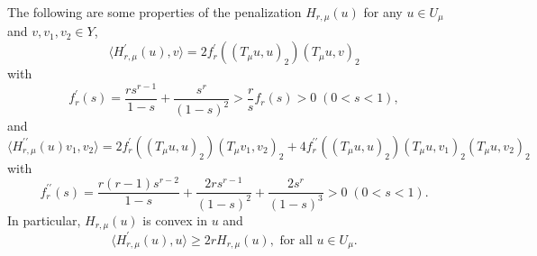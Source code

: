 \documentclass[11pt]{amsart}
\numberwithin{equation}{section}
\begin{document}
The following are some properties of the penalization $H_{r, \mu}(u)$ for any $u \in U_{\mu}$ and $v, v_{1}, v_{2} \in Y$,
$$
\langle H_{r, \mu}^{\prime}(u), v\rangle=2 f_{r}^{\prime}((T_{\mu} u, u)_{2})(T_{\mu} u, v)_{2}
$$
with
$$
f_{r}^{\prime}(s)=\frac{r s^{r-1}}{1-s}+\frac{s^{r}}{(1-s)^{2}}>\frac{r}{s} f_{r}(s)>0 \;(0<s<1),
$$
and
\begin{equation*}
\langle H_{r, \mu}^{\prime \prime}(u) v_{1}, v_{2}\rangle=2 f_{r}^{\prime}((T_{\mu} u, u)_{2})(T_{\mu} v_{1}, v_{2})_{2}+4 f_{r}^{\prime \prime}((T_{\mu} u, u)_{2})(T_{\mu} u, v_{1})_{2}(T_{\mu} u, v_{2})_{2}
\end{equation*}
with
$$
f_{r}^{\prime \prime}(s)=\frac{r(r-1) s^{r-2}}{1-s}+\frac{2 r s^{r-1}}{(1-s)^{2}}+\frac{2 s^{r}}{(1-s)^{3}}>0 \;(0<s<1).
$$
In particular, $H_{r, \mu}(u)$ is convex in $u$ and
$$
\langle H_{r, \mu}^{\prime}(u), u\rangle \geq 2 r H_{r, \mu}(u),\,\,\text{for all}\,\,u \in U_{\mu}.
$$
\end{document}
